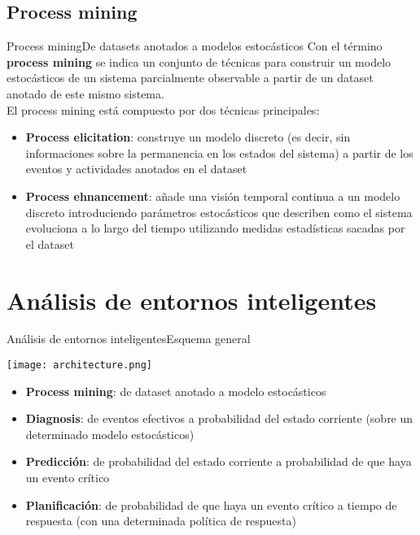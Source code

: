 \documentclass[9pt, handout]{beamer}
\begin{document}
    \subsection{Process mining}
      \begin{frame}{Process mining}{De datasets anotados a modelos estocásticos}
        Con el término \textbf{process mining} se indica un conjunto de técnicas para construir un modelo estocásticos de un sistema parcialmente observable a partir de un dataset anotado de este mismo sistema.\\[1em]
        
        El process mining está compuesto por dos técnicas principales:
        \begin{itemize}
          \item \textbf{Process elicitation}: construye un modelo discreto (es decir, sin informaciones sobre la permanencia en los estados del sistema) a partir de los eventos y actividades anotados en el dataset
          \item \textbf{Process ehnancement}: añade una visión temporal continua a un modelo discreto introduciendo parámetros estocásticos que describen como el sistema evoluciona a lo largo del tiempo utilizando medidas estadísticas sacadas por el dataset
        \end{itemize}
      \end{frame}
    
  \section{Análisis de entornos inteligentes}
  
    \begin{frame}{Análisis de entornos inteligentes}{Esquema general}
      \begin{center}
        \texttt{[image: architecture.png]}
      \end{center}
      
      \begin{itemize}
        \item \textbf{Process mining}: de dataset anotado a modelo estocásticos
        \item \textbf{Diagnosis}: de eventos efectivos a probabilidad del estado corriente (sobre un determinado modelo estocásticos)
        \item \textbf{Predicción}: de probabilidad del estado corriente a probabilidad de que haya un evento crítico
        \item \textbf{Planificación}: de probabilidad de que haya un evento crítico a tiempo de respuesta (con una determinada política de respuesta)
      \end{itemize}
    \end{frame}
  
\end{document}
